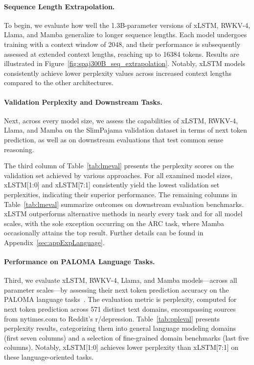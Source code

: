 \paragraph{Sequence Length Extrapolation.}
\label{sec:spaj300B_ctx_extrapolation}
To begin, we evaluate how well the 1.3B-parameter versions of xLSTM, RWKV-4, Llama, and Mamba generalize to longer sequence lengths. Each model undergoes training with a context window of 2048, and their performance is subsequently assessed at extended context lengths, reaching up to 16384 tokens. Results are illustrated in Figure~\ref{fig:spaj300B_seq_extrapolation}. Notably, xLSTM models consistently achieve lower perplexity values across increased context lengths compared to the other architectures.

\paragraph{Validation Perplexity and Downstream Tasks.}
\label{sec:spaj_downstream_eval}
Next, across every model size, we assess the capabilities of xLSTM, RWKV-4, Llama, and Mamba on the SlimPajama validation dataset in terms of next token prediction, as well as on downstream evaluations that test common sense reasoning.

The third column of Table~\ref{tab:lmeval} presents the perplexity scores on the validation set achieved by various approaches. For all examined model sizes, xLSTM[1:0] and xLSTM[7:1] consistently yield the lowest validation set perplexities, indicating their superior performance. The remaining columns in Table~\ref{tab:lmeval} summarize outcomes on downstream evaluation benchmarks. xLSTM outperforms alternative methods in nearly every task and for all model scales, with the sole exception occurring on the ARC task, where Mamba occasionally attains the top result. Further details can be found in Appendix~\ref{sec:appExpLanguage}.

\paragraph{Performance on PALOMA Language Tasks.} Third, we evaluate xLSTM, RWKV-4, Llama, and Mamba models—across all parameter scales—by assessing their next token prediction accuracy on the PALOMA language tasks~\citep{Magnusson:23arxivshort}. The evaluation metric is perplexity, computed for next token prediction across 571 distinct text domains, encompassing sources from nytimes.com to Reddit's r/depression. Table~\ref{tab:ppleval} presents perplexity results, categorizing them into general language modeling domains (first seven columns) and a selection of fine-grained domain benchmarks (last five columns). Notably, xLSTM[1:0] achieves lower perplexity than xLSTM[7:1] on these language-oriented tasks.


